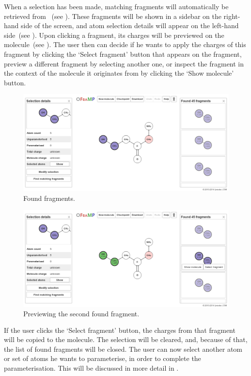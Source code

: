 When a selection has been made, matching fragments will automatically be retrieved from \omfraf~(see ). These fragments will be shown in a sidebar on the right-hand side of the screen, and atom selection details will appear on the left-hand side~(see ). Upon clicking a fragment, its charges will be previewed on the molecule~(see ). The user then can decide if he wants to apply the charges of this fragment by clicking the `Select fragment' button that appears on the fragment, preview a different fragment by selecting another one, or inspect the fragment in the context of the molecule it originates from by clicking the `Show molecule' button.

\begin{figure}
\center
\includegraphics[width=.9\textwidth]{img/find_1.png}
\caption{Found fragments.}
\end{figure}

\begin{figure}
\center
\includegraphics[width=.9\textwidth]{img/find_2.png}
\caption{Previewing the second found fragment.}
\end{figure}

If the user clicks the `Select fragment' button, the charges from that fragment will be copied to the molecule. The selection will be cleared, and, because of that, the list of found fragments will be closed. The user can now select another atom or set of atoms he wants to parameterise, in order to complete the parameterisation. This will be discussed in more detail in .


